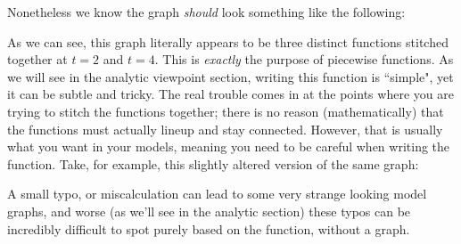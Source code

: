 \documentclass{ximera}
\begin{document}
Nonetheless we know the graph \textit{should} look something like the following:
\begin{center}
\end{center}

As we can see, this graph literally appears to be three distinct functions stitched together at $t = 2$ and $t=4$. This is \textit{exactly} the purpose of piecewise functions. As we will see in the analytic viewpoint section, writing this function is ``simple", yet it can be subtle and tricky. The real trouble comes in at the points where you are trying to stitch the functions together; there is no reason (mathematically) that the functions must actually lineup and stay connected. However, that is usually what you want in your models, meaning you need to be careful when writing the function. Take, for example, this slightly altered version of the same graph:

\begin{center}
\end{center}
A small typo, or miscalculation can lead to some very strange looking model graphs, and worse (as we'll see in the analytic section) these typos can be incredibly difficult to spot purely based on the function, without a graph.
\end{document}
